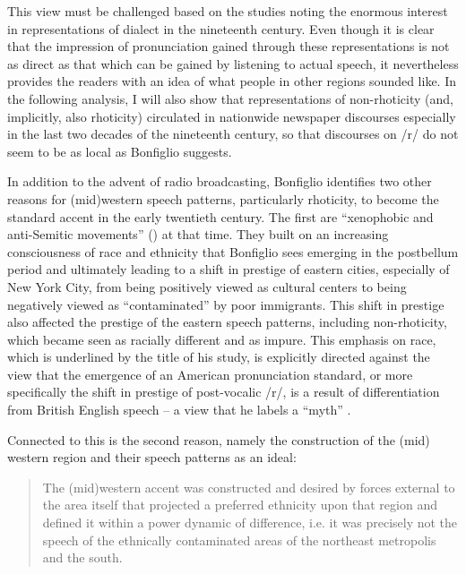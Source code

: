 This view must be challenged based on the studies noting the enormous interest in representations of dialect in the nineteenth century. Even though it is clear that the impression of pronunciation gained through these representations is not as direct as that which can be gained by listening to actual speech, it nevertheless provides the readers with an idea of what people in other regions sounded like. In the following analysis, I will also show that representations of non-rhoticity (and, implicitly, also rhoticity) circulated in nationwide newspaper discourses especially in the last two decades of the nineteenth century, so that discourses on /r/ do not seem to be as local as Bonfiglio suggests.


In addition to the advent of radio broadcasting, Bonfiglio identifies two other reasons for (mid)western speech patterns, particularly rhoticity, to become the standard accent in the early twentieth century. The first are “xenophobic and anti-Semitic movements” (\citeyear[4]{Bonfiglio2002}) at that time. They built on an increasing consciousness of race and ethnicity that Bonfiglio sees emerging in the postbellum period and ultimately leading to a shift in prestige of eastern cities, especially of New York City, from being positively viewed as cultural centers to being negatively viewed as “contaminated” by poor immigrants. This shift in prestige also affected the prestige of the eastern speech patterns, including non-rhoticity, which became seen as racially different and as impure. This emphasis on race, which is underlined by the title of his study, is explicitly directed against the view that the emergence of an American pronunciation standard, or more specifically the shift in prestige of post-vocalic /r/, is a result of differentiation from British English speech – a view that he labels a “myth” \citep[2]{Bonfiglio2002}.

Connected to this is the second reason, namely the construction of the (mid) western region and their speech patterns as an ideal:

\begin{quote}
The (mid)western accent was constructed and desired by forces external to the area itself that projected a preferred ethnicity upon that region and defined it within a power dynamic of difference, i.e. it was precisely not the speech of the ethnically contaminated areas of the northeast metropolis and the south. \citep[8]{Bonfiglio2002}
\end{quote}

